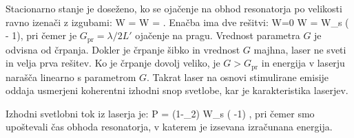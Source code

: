 Stacionarno stanje je doseženo, ko se ojačenje na obhod resonatorja po velikosti ravno izenači z izgubami:
\beq
\Delta W = \Lambda W = .
\eeq
Enačba ima dve rešitvi:
\beq
W=0 \qquad {} \qquad W = W_s \left( - 1\right),
\eeq
pri čemer je $G_\mathrm{pr} = \lambda/2L'$ ojačenje na pragu. Vrednost parametra $G$ 
je odvisna od črpanja. Dokler je črpanje šibko in vrednost $G$ majhna, laser ne sveti in velja prva rešitev. 
Ko je črpanje dovolj veliko, je $G>G_\mathrm{pr}$ in energija v laserju narašča linearno s parametrom $G$.
Takrat laser na osnovi stimulirane emisije oddaja usmerjeni koherentni izhodni snop svetlobe, kar
je karakteristika laserjev.

Izhodni svetlobni tok iz laserja je:
\beq
P = (1-_2) W_s \left( -1\right) ,
\eeq
pri čemer smo upoštevali čas obhoda resonatorja, v katerem je izsevana izračunana energija.
